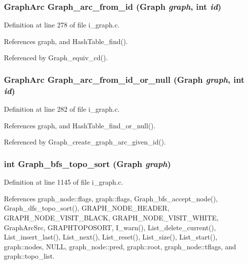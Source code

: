 \subsubsection{\setlength{\rightskip}{0pt plus 5cm}\bf{Graph\-Arc} Graph\_\-arc\_\-from\_\-id (\bf{Graph} {\em graph}, int {\em id})}\label{i__graph_8h_675eba5d8d8324e5bb6ac0e81d1a342a}




Definition at line 278 of file i\_\-graph.c.

References graph, and Hash\-Table\_\-find().

Referenced by Graph\_\-equiv\_\-cd().
\subsubsection{\setlength{\rightskip}{0pt plus 5cm}\bf{Graph\-Arc} Graph\_\-arc\_\-from\_\-id\_\-or\_\-null (\bf{Graph} {\em graph}, int {\em id})}\label{i__graph_8h_5d51d011de35944a8cae6e67a0fcad20}




Definition at line 282 of file i\_\-graph.c.

References graph, and Hash\-Table\_\-find\_\-or\_\-null().

Referenced by Graph\_\-create\_\-graph\_\-arc\_\-given\_\-id().
\subsubsection{\setlength{\rightskip}{0pt plus 5cm}int Graph\_\-bfs\_\-topo\_\-sort (\bf{Graph} {\em graph})}\label{i__graph_8h_5aca2dfc1246d509c7eea0a205e02a43}




Definition at line 1145 of file i\_\-graph.c.

References graph\_\-node::flags, graph::flags, Graph\_\-bfs\_\-accept\_\-node(), Graph\_\-dfs\_\-topo\_\-sort(), GRAPH\_\-NODE\_\-HEADER, GRAPH\_\-NODE\_\-VISIT\_\-BLACK, GRAPH\_\-NODE\_\-VISIT\_\-WHITE, Graph\-Arc\-Src, GRAPHTOPOSORT, I\_\-warn(), List\_\-delete\_\-current(), List\_\-insert\_\-last(), List\_\-next(), List\_\-reset(), List\_\-size(), List\_\-start(), graph::nodes, NULL, graph\_\-node::pred, graph::root, graph\_\-node::tflags, and graph::topo\_\-list.
